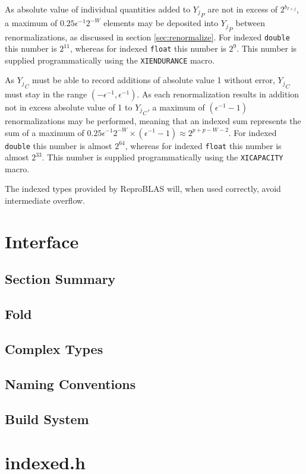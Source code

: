 \documentclass[12pt]{article}
\theoremstyle{plain}
\numberwithin{equation}{section}
\begin{document}
    As absolute value of individual quantities added to ${Y_j}_P$ are not in excess of $2^{b_{I + j}}$, a maximum of $0.25\epsilon^{-1}2^{-W}$ elements may be deposited into ${Y_j}_P$ between renormalizations, as discussed in section \ref{sec:renormalize}. For indexed \verb|double| this number is $2^{11}$, whereas for indexed \verb|float| this number is $2^9$. This number is supplied programmatically using the \verb|XIENDURANCE| macro.

    As ${Y_j}_C$ must be able to record additions of absolute value 1 without error, ${Y_j}_C$ must stay in the range $(-\epsilon^{-1}, \epsilon^{-1})$. As each renormalization results in addition not in excess absolute value of 1 to ${Y_j}_C$, a maximum of $(\epsilon^{-1} - 1)$ renormalizations may be performed, meaning that an indexed sum represents the sum of a maximum of $0.25\epsilon^{-1}2^{-W} \times (\epsilon^{-1} - 1) \approx 2^{p + p - W - 2}$. For indexed \verb|double| this number is almost $2^{64}$, whereas for indexed \verb|float| this number is almost $2^{33}$. This number is supplied programmatically using the \verb|XICAPACITY| macro.

    The indexed types provided by ReproBLAS will, when used correctly, avoid intermediate overflow.

\section{Interface}
  \subsection{Section Summary}
  \subsection{Fold}
  \subsection{Complex Types}
  \subsection{Naming Conventions}
  \subsection{Build System}
\section{indexed.h}
\end{document}
